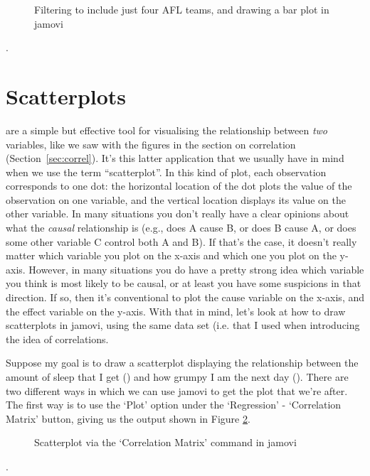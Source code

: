 \begin{figure}[h!!]
\begin{center}
\caption{Filtering to include just four AFL teams, and drawing a bar plot in jamovi}
\label{fig:bar1}
\HR
\end{center}
\end{figure}. 


\section{Scatterplots\label{sec:scatterplots}}

 are a simple but effective tool for visualising the relationship between {\it two} variables, like we saw with the figures in the section on correlation (Section~\ref{sec:correl}). It's this latter application that we usually have in mind when we use the term ``scatterplot''. In this kind of plot, each observation corresponds to one dot: the horizontal location of the dot plots the value of the observation on one variable, and the vertical location displays its value on the other variable. In many situations you don't really have a clear opinions about what the {\it causal} relationship is (e.g., does A cause B, or does B cause A, or does some other variable C control both A and B). If that's the case, it doesn't really matter which variable you plot on the x-axis and which one you plot on the y-axis. However, in many situations you do have a pretty strong idea which variable you think is most likely to be causal, or at least you have some suspicions in that direction. If so, then it's conventional to plot the cause variable on the x-axis, and the effect variable on the y-axis. With that in mind, let's look at how to draw scatterplots in jamovi, using the same  data set (i.e.  that I used when introducing the idea of correlations.

Suppose my goal is to draw a scatterplot displaying the relationship between the amount of sleep that I get () and how grumpy I am the next day (). There are two different ways in which we can use jamovi to get the plot that we're after. The first way is to use the `Plot' option under the `Regression' - `Correlation Matrix' button, giving us the output shown in Figure \ref{fig:scatterplot1}.

\begin{figure}[t!!]
\begin{center}
\caption{Scatterplot via the `Correlation Matrix' command in jamovi}
\label{fig:scatterplot1}
\HR
\end{center}
\end{figure}. 


